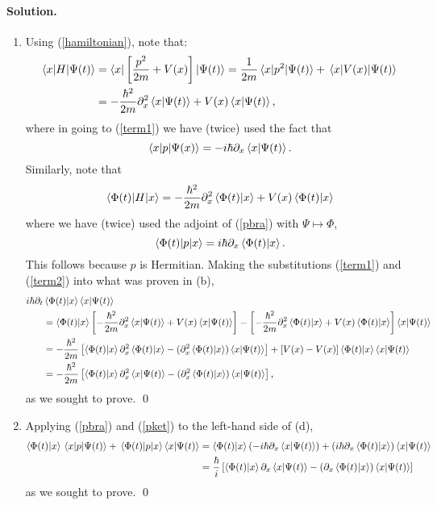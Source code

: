 \documentclass[11pt]{article}
\newcommand{\refeq}[1]{(\ref{#1})}
\newenvironment{solution}
{
    \paragraph{Solution.}
    \ignorespaces
}
{
}
\begin{document}
\begin{solution}
\begin{enumerate}
		\item Using \refeq{hamiltonian}, note that:
			\begin{align}
				\mel{x}{H}{\Psi(t)} &= \bra{x} \left[ \frac{p^2}{2m} + V(x) \right] \ket{\Psi(t)} = \frac{1}{2m} \mel{x}{p^2}{\Psi(t)} + \mel{x}{V(x)}{\Psi(t)} \\
				&= -\frac{\hbar^2}{2m} \partial_x^2 \braket{x}{\Psi(t)} + V(x) \braket{x}{\Psi(t)}, \label{term1}
			\end{align}
			where in going to \refeq{term1} we have (twice) used the fact that
			\begin{equation} \label{pbra}
				\mel{x}{p}{\Psi(x)} = -i \hbar \partial_x \braket{x}{\Psi(t)}.
			\end{equation}
			Similarly, note that
			\begin{equation} \label{term2}
				\mel{\Phi(t)}{H}{x} = -\frac{\hbar^2}{2m} \partial_x^2 \braket{\Phi(t)}{x} + V(x) \braket{\Phi(t)}{x}
			\end{equation}
			where we have (twice) used the adjoint of \refeq{pbra} with $\Psi \mapsto \Phi$,
			\begin{equation} \label{pket}
				 \mel{\Phi(t)}{p}{x} = i \hbar \partial_x \braket{\Phi(t)}{x}.
			\end{equation}
			This follows because $p$ is Hermitian.  Making the substitutions \refeq{term1} and \refeq{term2} into what was proven in (b),
			\begin{align}
				i \hbar \partial_t &\braket{\Phi(t)}{x} \braket{x}{\Psi(t)} \notag \\
				&= \braket{\Phi(t)}{x} \left[ -\frac{\hbar^2}{2m} \partial_x^2 \braket{x}{\Psi(t)} + V(x) \braket{x}{\Psi(t)} \right] - \left[ -\frac{\hbar^2}{2m} \partial_x^2 \braket{\Phi(t)}{x} + V(x) \braket{\Phi(t)}{x} \right] \braket{x}{\Psi(t)} \\
				&= -\frac{\hbar^2}{2m} \left[ \braket{\Phi(t)}{x} \partial_x^2 \braket{\Phi(t)}{x} - (\partial_x^2 \braket{\Phi(t)}{x}) \braket{x}{\Psi(t)} \right] + \left[ V(x) - V(x) \right] \braket{\Phi(t)}{x} \braket{x}{\Psi(t)} \\
				&= -\dfrac{\hbar^2}{2m} \left[ \braket{\Phi(t)}{x} \partial_x^2 \braket{x}{\Psi(t)} - (\partial_x^2 \braket{\Phi(t)}{x}) \braket{x}{\Psi(t)} \right],
			\end{align}
			as we sought to prove. \qed
			
		\item Applying \refeq{pbra} and \refeq{pket} to the left-hand side of (d),
			\begin{align}
				\braket{\Phi(t)}{x} \mel{x}{p}{\Psi(t)} + \mel{\Phi(t)}{p}{x} \braket{x}{\Psi(t)} &= \braket{\Phi(t)}{x} (-i \hbar \partial_x \braket{x}{\Psi(t)}) + (i \hbar \partial_x \braket{\Phi(t)}{x}) \braket{x}{\Psi(t)} \\
				&= \dfrac{\hbar}{i} \left[ \braket{\Phi(t)}{x} \partial_x \braket{x}{\Psi(t)} - (\partial_x \braket{\Phi(t)}{x}) \braket{x}{\Psi(t)} \right]
			\end{align}
			as we sought to prove. \qed
			

\end{enumerate}
\end{solution}
\end{document}

